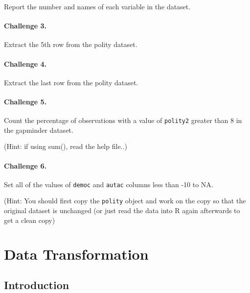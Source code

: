 \documentclass[]{book}
\begin{document}
Report the number and names of each variable in the dataset.

\hypertarget{challenge-3.-3}{%
\subsubsection*{Challenge 3.}\label{challenge-3.-3}}

Extract the 5th row from the polity dataset.

\hypertarget{challenge-4.-1}{%
\subsubsection*{Challenge 4.}\label{challenge-4.-1}}

Extract the last row from the polity dataset.

\hypertarget{challenge-5.}{%
\subsubsection*{Challenge 5.}\label{challenge-5.}}

Count the percentage of observations with a value of \texttt{polity2} greater than 8 in the gapminder dataset.

(Hint: if using sum(), read the help file..)

\hypertarget{challenge-6.}{%
\subsubsection*{Challenge 6.}\label{challenge-6.}}

Set all of the values of \texttt{democ} and \texttt{autac} columns less than -10 to NA.

(Hint: You should first copy the \texttt{polity} object and work on the copy so that the original dataset is unchanged (or just read the data into R again afterwards to get a clean copy)

\hypertarget{data-transformation}{%
\chapter{Data Transformation}\label{data-transformation}}

\hypertarget{introduction-1}{%
\section{Introduction}\label{introduction-1}}
\end{document}
